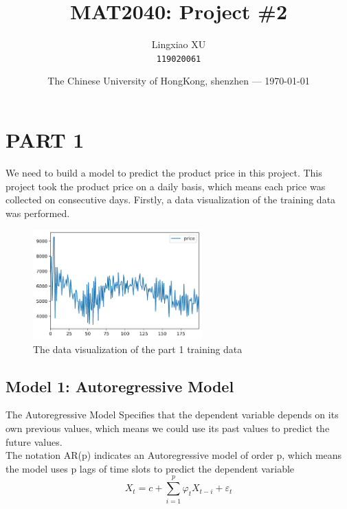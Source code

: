 \documentclass{article}
\title{MAT2040: Project \#2} %
\author{Lingxiao XU\\ \texttt{119020061}} %
\date{The Chinese University of HongKong, shenzhen --- \today} %
\begin{document}
\maketitle 


\section*{PART 1} 

We need to build a model to predict the product price in this project. This project took the product price on a daily basis, which means each price was collected on consecutive days. Firstly, a data visualization of the training data was performed.
\begin{figure}[htbp]\centering
	\includegraphics[width=6.5cm]{Part1_trainingData.png}
	\caption{The data visualization of the part 1 training data}
	\label{fig:part1_training}
\end{figure}

\subsection*{Model 1: Autoregressive Model}
The Autoregressive Model Specifies that the dependent variable depends on its own previous values, which means we could use its past values to predict the future values.
\\The notation AR(p) indicates an Autoregressive model of order p, which means the model uses p lags of time slots to predict the dependent variable
\begin{equation}
	X_{t} = c + \sum_{i=1}^{p}\varphi_{t}X_{t-i} + \varepsilon_{t} \label{1}
\end{equation}
\end{document}
